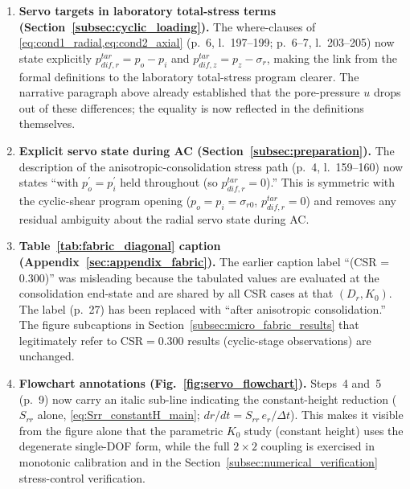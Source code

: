 \documentclass[11pt,a4paper]{article}
\newcommand{\manref}[1]{(#1)}                  %
\newcommand{\Kzero}{\ensuremath{K_0}}
\begin{document}
\begin{enumerate}[label=M\arabic*., leftmargin=*]
\item \textbf{Servo targets in laboratory total-stress terms
      (Section~\ref{subsec:cyclic_loading}).} The where-clauses of
      \cref{eq:cond1_radial,eq:cond2_axial}
      \manref{p.~6, l.~197--199; p.~6--7, l.~203--205} now state
      explicitly $p_{dif,r}^{tar}=p_o-p_i$ and
      $p_{dif,z}^{tar}=p_z-\sigma_r$, making the link from the formal
      definitions to the laboratory total-stress program clearer. The
      narrative paragraph above already established that the
      pore-pressure $u$ drops out of these differences; the equality
      is now reflected in the definitions themselves.

\item \textbf{Explicit servo state during AC
      (Section~\ref{subsec:preparation}).} The description of the
      anisotropic-consolidation stress path \manref{p.~4, l.~159--160}
      now states ``with $p_o^{\prime}=p_i^{\prime}$ held throughout
      (so $p_{dif,r}^{tar}=0$).'' This is symmetric with the
      cyclic-shear program opening
      ($p_o=p_i=\sigma_{r0}$, $p_{dif,r}^{tar}=0$) and removes any
      residual ambiguity about the radial servo state during AC.

\item \textbf{Table~\ref{tab:fabric_diagonal} caption
      (Appendix~\ref{sec:appendix_fabric}).} The earlier caption
      label ``(CSR = 0.300)'' was misleading because the tabulated
      values are evaluated at the consolidation end-state and are
      shared by all CSR cases at that $(D_r,\Kzero)$. The label
      \manref{p.~27} has been replaced with ``after anisotropic
      consolidation.'' The figure subcaptions in
      Section~\ref{subsec:micro_fabric_results} that legitimately
      refer to CSR$=0.300$ results (cyclic-stage observations) are
      unchanged.

\item \textbf{Flowchart annotations
      (Fig.~\ref{fig:servo_flowchart}).} Steps~4 and~5
      \manref{p.~9} now carry an italic sub-line indicating the
      constant-height reduction
      ($S_{rr}$ alone, \cref{eq:Srr_constantH_main}; $dr/dt = S_{rr}\,
      e_r/\Delta t$). This makes it visible from the figure alone
      that the parametric \Kzero{} study (constant height) uses the
      degenerate single-DOF form, while the full $2\times 2$ coupling
      is exercised in monotonic calibration and in the
      Section~\ref{subsec:numerical_verification} stress-control
      verification.


\end{enumerate}
\end{document}
